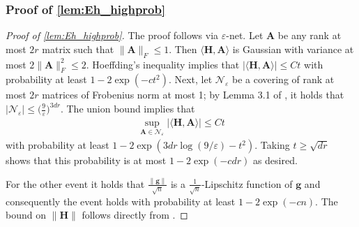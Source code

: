 \documentclass[10pt]{article}
\newcommand{\eps}{\ensuremath{\varepsilon}}
\theoremstyle{definition}
\begin{document}
\subsubsection{Proof of \cref{lem:Eh_highprob}} \label{sec:Eh_highprob_proof}
\begin{proof}[Proof of \cref{lem:Eh_highprob}]
The proof follows via $\eps$-net.  Let $\bm{A}$ be any rank at most $2r$ matrix such that $\|\bm{A}\|_F\leq 1$.  Then $\langle \bm{H}, \bm{A} \rangle$ is Gaussian with variance at most $2 \|\bm{A}\|_F^2 \leq 2$.  Hoeffding's inequality implies that $\bigg| \langle \bm{H},\bm{A} \rangle \bigg| \leq C t$ with probability at least $1 - 2 \exp( - c t^2)$.  Next, let $\mathcal{N}_{\eps}$ be a covering of rank at most $2r$ matrices of Frobenius norm at most 1; by Lemma 3.1 of \citet{candes_tight_2011}, it holds that $|\mathcal{N}_{\eps}| \leq \bigg( \frac{9}{\eps} \bigg)^{3 dr}$.  The union bound implies that
\begin{align}
    \sup_{\bm{A} \in \mathcal{N}_{\eps}} \bigg| \langle \bm{H},\bm{A} \rangle \bigg| \leq C t
\end{align}
with probability at least $1 - 2\exp( 3dr \log (9/\eps) - t^2 )$.  Taking $t \geq \sqrt{dr}$ shows that this probability is at most $1 - 2 \exp( - c d r)$ as desired.

For the other event it holds that $\frac{\|\bm{g}\|}{\sqrt{n}}$ is a $\frac{1}{\sqrt{n}}$-Lipschitz function of $\bm{g}$ and consequently the event holds with probability at least $1 - 2\exp( - c n)$.  The bound on $\|\bm{H}\|$ follows directly from \citet{bandeira_sharp_2016}.  
\end{proof}
\end{document}
